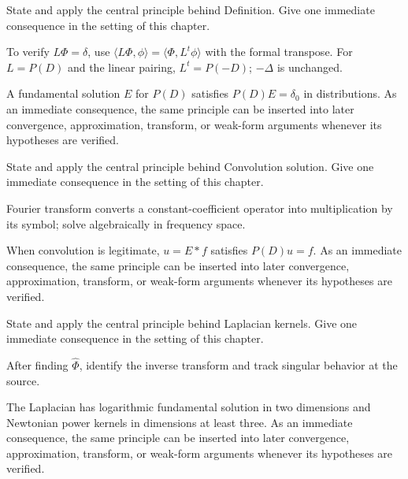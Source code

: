 \begin{exercise}\label{exr:iii24-01}
State and apply the central principle behind Definition. Give one immediate consequence in the setting of this chapter.
\end{exercise}
\begin{hint}
To verify \(L\Phi=\delta\), use $\langle L\Phi,\phi\rangle=\langle\Phi,L^t\phi\rangle$ with the formal transpose. For $L=P(D)$ and the linear pairing, $L^t=P(-D)$; $-\Delta$ is unchanged.
\end{hint}
\begin{solution}
A fundamental solution $E$ for $P(D)$ satisfies $P(D)E=\delta_0$ in distributions. As an immediate consequence, the same principle can be inserted into later convergence, approximation, transform, or weak-form arguments whenever its hypotheses are verified.
\end{solution}

\begin{exercise}\label{exr:iii24-02}
State and apply the central principle behind Convolution solution. Give one immediate consequence in the setting of this chapter.
\end{exercise}
\begin{hint}
Fourier transform converts a constant-coefficient operator into multiplication by its symbol; solve algebraically in frequency space.
\end{hint}
\begin{solution}
When convolution is legitimate, $u=E*f$ satisfies $P(D)u=f$. As an immediate consequence, the same principle can be inserted into later convergence, approximation, transform, or weak-form arguments whenever its hypotheses are verified.
\end{solution}

\begin{exercise}\label{exr:iii24-03}
State and apply the central principle behind Laplacian kernels. Give one immediate consequence in the setting of this chapter.
\end{exercise}
\begin{hint}
After finding \(\widehat\Phi\), identify the inverse transform and track singular behavior at the source.
\end{hint}
\begin{solution}
The Laplacian has logarithmic fundamental solution in two dimensions and Newtonian power kernels in dimensions at least three. As an immediate consequence, the same principle can be inserted into later convergence, approximation, transform, or weak-form arguments whenever its hypotheses are verified.
\end{solution}

